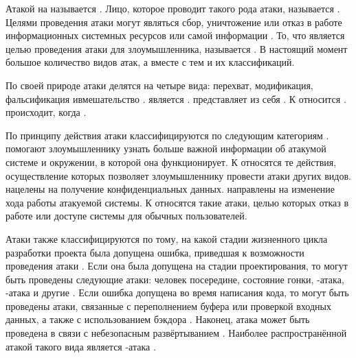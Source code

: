 %
Атакой на  называется  .
%
Лицо, которое проводит такого рода атаки, называется  . 
%
Целями проведения атаки могут являться сбор, уничтожение или отказ в работе информационных системных ресурсов или самой информации . 
%
То, что является целью проведения атаки для злоумышленника, называется . 
%
В настоящий момент большое количество видов атак, а вместе с тем и их классификаций.

%
По своей природе атаки делятся на четыре вида: перехват, модификация, фальсификация ивмешательство . 
%
 является .
%
 представляет из себя .
%
К  относится .
%
 происходит, когда .

%
По принципу действия атаки классифицируются по следующим категориям .
%
 помогают злоумышленнику узнать больше важной информации об атакумой системе и окружении, в которой она функционирует.
%
К  относятся те действия, осуществление которых позволяет злоумышленнику провести атаки других видов. 
%
 нацелены на получение конфиденциальных данных. 
%
 направлены на изменение хода работы атакуемой системы. 
%
К  относятся такие атаки, целью которых отказ в работе или доступе системы для обычных пользователей. 

%
Атаки также классифицируются по тому, на какой стадии жизненного цикла разработки проекта была допущена ошибка, приведшая к возможности проведения атаки .
%
Если она была допущена на стадии проектирования, то могут быть проведены следующие атаки: человек посередине, состояние гонки, -атака, -атака и другие .
%
Если ошибка допущена во время написания кода, то могут быть проведены атаки, связанные с переполнением буфера или проверкой входных данных, а также с использованием бэкдора .
%
Наконец, атака может быть проведена в связи с небезопасным развёртыванием . 
%
Наиболее распространённой атакой такого вида является -атака 
. 

